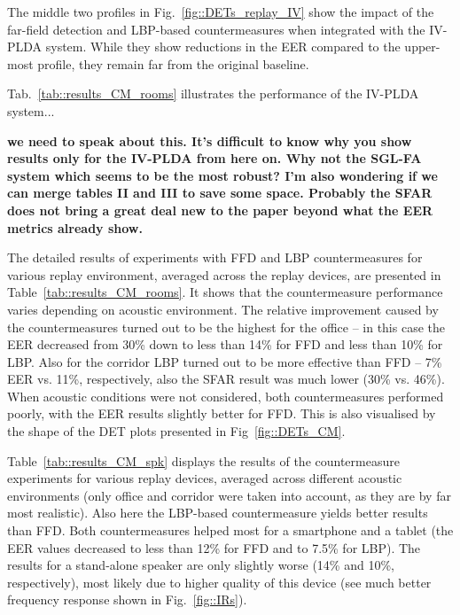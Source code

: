 The middle two profiles in Fig.~\ref{fig::DETs_replay_IV} show the impact of the far-field detection and LBP-based countermeasures when integrated with the IV-PLDA system.  While they show reductions in the EER compared to the upper-most profile, they remain far from the original baseline.

Tab.~\ref{tab::results_CM_rooms} illustrates the performance of the IV-PLDA system...


{\bfseries we need to speak about this.  It's difficult to know why you show results only for the IV-PLDA from here on.  Why not the SGL-FA system which seems to be the most robust?  I'm also wondering if we can merge tables II and III to save some space.  Probably the SFAR does not bring a great deal new to the paper beyond what the EER metrics already show. }

The detailed results of experiments with FFD and LBP countermeasures for various replay environment, averaged across the replay devices, are presented in Table~\ref{tab::results_CM_rooms}. It shows that the countermeasure performance varies depending on acoustic environment. The relative improvement caused by the countermeasures turned out to be the highest for the office -- in this case the EER decreased from 30\% down to less than 14\% for FFD and less than 10\% for LBP. Also for the corridor LBP turned out to be more effective than FFD -- 7\% EER vs. 11\%, respectively, also the SFAR result was much lower (30\% vs. 46\%). When acoustic conditions were not considered, both countermeasures performed poorly, with the EER results slightly better for FFD. This is also visualised by the shape of the DET plots presented in Fig~\ref{fig::DETs_CM}.

Table~\ref{tab::results_CM_spk} displays the results of the countermeasure experiments for various replay devices, averaged across different acoustic environments (only office and corridor were taken into account, as they are by far most realistic). Also here the LBP-based countermeasure yields better results than FFD. Both countermeasures helped most for a smartphone and a tablet (the EER values decreased to less than 12\% for FFD and to 7.5\% for LBP). The results for a stand-alone speaker are only slightly worse (14\% and 10\%, respectively), most likely due to higher quality of this device (see much better frequency response shown in Fig.~\ref{fig::IRs}). 


